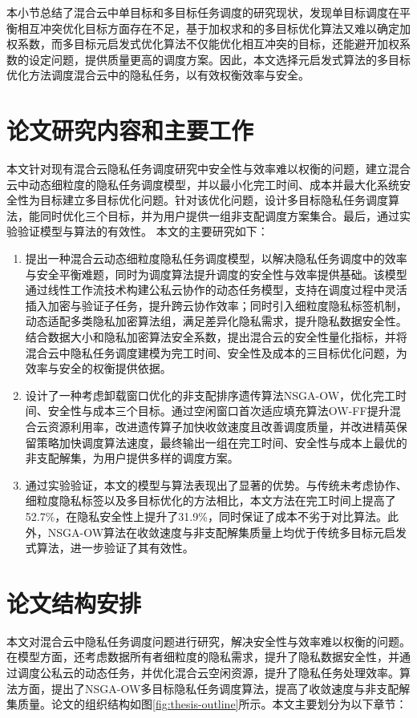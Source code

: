 本小节总结了混合云中单目标和多目标任务调度的研究现状，发现单目标调度在平衡相互冲突优化目标方面存在不足，基于加权求和的多目标优化算法又难以确定加权系数，而多目标元启发式优化算法不仅能优化相互冲突的目标，还能避开加权系数的设定问题，提供质量更高的调度方案。因此，本文选择元启发式算法的多目标优化方法调度混合云中的隐私任务，以有效权衡效率与安全。

\section{论文研究内容和主要工作}

本文针对现有混合云隐私任务调度研究中安全性与效率难以权衡的问题，建立混合云中动态细粒度的隐私任务调度模型，并以最小化完工时间、成本并最大化系统安全性为目标建立多目标优化问题。针对该优化问题，设计多目标隐私任务调度算法，能同时优化三个目标，并为用户提供一组非支配调度方案集合。最后，通过实验验证模型与算法的有效性。
本文的主要研究如下：

\begin{enumerate}
    \item 提出一种混合云动态细粒度隐私任务调度模型，以解决隐私任务调度中的效率与安全平衡难题，同时为调度算法提升调度的安全性与效率提供基础。该模型通过线性工作流技术构建公私云协作的动态任务模型，支持在调度过程中灵活插入加密与验证子任务，提升跨云协作效率；同时引入细粒度隐私标签机制，动态适配多类隐私加密算法组，满足差异化隐私需求，提升隐私数据安全性。结合数据大小和隐私加密算法安全系数，提出混合云的安全性量化指标，并将混合云中隐私任务调度建模为完工时间、安全性及成本的三目标优化问题，为效率与安全的权衡提供依据。
    \item 设计了一种考虑卸载窗口优化的非支配排序遗传算法NSGA-OW，优化完工时间、安全性与成本三个目标。通过空闲窗口首次适应填充算法OW-FF提升混合云资源利用率，改进遗传算子加快收敛速度且改善调度质量，并改进精英保留策略加快调度算法速度，最终输出一组在完工时间、安全性与成本上最优的非支配解集，为用户提供多样的调度方案。
    \item 通过实验验证，本文的模型与算法表现出了显著的优势。与传统未考虑协作、细粒度隐私标签以及多目标优化的方法相比，本文方法在完工时间上提高了52.7\%，在隐私安全性上提升了31.9\%，同时保证了成本不劣于对比算法。此外，NSGA-OW算法在收敛速度与非支配解集质量上均优于传统多目标元启发式算法，进一步验证了其有效性。
\end{enumerate}

\section{论文结构安排}
本文对混合云中隐私任务调度问题进行研究，解决安全性与效率难以权衡的问题。在模型方面，还考虑数据所有者细粒度的隐私需求，提升了隐私数据安全性，并通过调度公私云的动态任务，并优化混合云空闲资源，提升了隐私任务处理效率。算法方面，提出了NSGA-OW多目标隐私任务调度算法，提高了收敛速度与非支配解集质量。论文的组织结构如图\ref{fig:thesis-outline}所示。本文主要划分为以下章节：

